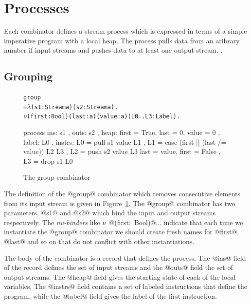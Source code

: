 \section{Processes}
\label{s:Processes}

Each combinator defines a stream process which is expressed in terms of a simple imperative program with a local heap. The process pulls data from an aribrary number if input streams and pushes data to at least one output stream. . 


\subsection{Grouping}
\begin{figure}
\begin{alltt}
 group 
   = \(\lambda\) (s1: Stream a) (s2: Stream a). 
     \(\nu\) (first: Bool)  (last: a) (value: a) (L0..L3: Label).
\end{alltt}
\begin{code}
     process
     { ins:    { s1 }
     , outs:   { s2 }
     , heap:   { first = True, last = 0, value = 0 }
     , label:  L0
     , instrs: { L0 = pull s1 value                    L1 {}
               , L1 = case (first || (last /= value))  L2 {}  L3 {}
               , L2 = push s2 value                    L3 { last = value, first = False }
               , L3 = drop s1                          L0 {} } }
\end{code}
\caption{The group combinator}
\label{fig:Process:Group}
\end{figure}


The definition of the @group@ combinator which removes consecutive elements from its input stream is given in Figure~\ref{fig:Process:Group}. The @group@ combinator has two parameters, @s1@ and @s2@ which bind the input and output streams respectively. The \emph{nu-binders} like \mbox{$\nu$ @(first: Bool)@...} indicate that each time we instantiate the @group@ combinator we should create fresh names for @first@, @last@ and so on that do not conflict with other instantiations. 

The body of the combinator is a record that defines the process. The @ins@ field of the record defines the set of input streams and the @outs@ field the set of output streams. The @heap@ field gives the starting state of each of the local variables. The @instrs@ field contains a set of labeled instructions that define the program, while the @label@ field gives the label of the first instruction. 

